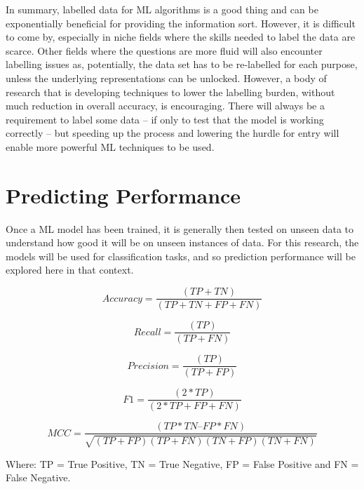 In summary, labelled data for ML algorithms is a good thing and can be exponentially beneficial for providing the information sort. However, it is difficult to come by, especially in niche fields where the skills needed to label the data are scarce. Other fields where the questions are more fluid will also encounter labelling issues as, potentially, the data set has to be re-labelled for each purpose, unless the underlying representations can be unlocked. However, a body of research that is developing techniques to lower the labelling burden, without much reduction in overall accuracy, is encouraging. There will always be a requirement to label some data – if only to test that the model is working correctly – but speeding up the process and lowering the hurdle for entry will enable more powerful ML techniques to be used.


\section{Predicting Performance} Once a ML model has been trained, it is generally then tested on unseen data to understand how good it will be on unseen instances of data. For this research, the models will be used for classification tasks, and so prediction performance will be explored here in that context.

\begin{equation}
Accuracy =  \frac{(TP+TN)}{(TP + TN + FP + FN)}
\label{eqn:acc}
\end{equation}

\begin{equation}
Recall =  \frac{(TP)}{(TP + FN)}
\label{eqn:recall_1}
\end{equation}

\begin{equation}
Precision=  \frac{(TP)}{(TP + FP)}
\label{eqn:prec}
\end{equation}

\begin{equation}
F1 =  \frac{(2 * TP)}{(2*TP + FP + FN)}
\label{eqn:f1}
\end{equation}

\begin{equation}
MCC =  \frac{(TP*TN – FP*FN)}{\sqrt{(TP+FP)(TP+FN)(TN+FP)(TN+FN)}}
\label{eqn:mcc}
\end{equation}

Where: TP = True Positive, TN = True Negative, FP = False Positive and FN = False Negative.

